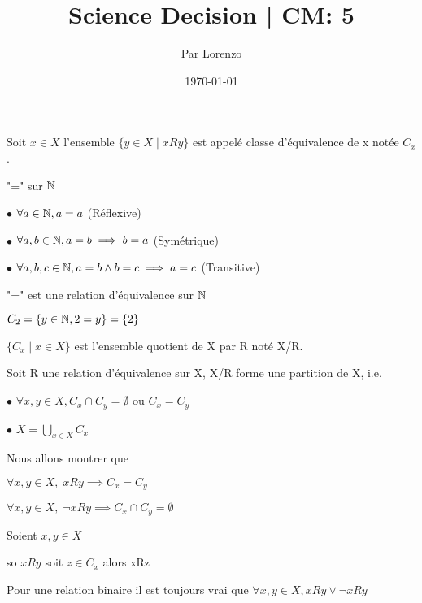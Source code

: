 \documentclass[a4paper, 12pt]{article}
\title{Science Decision | CM: 5}
\author{Par Lorenzo}
\date{\today}
\begin{document}
\maketitle

Soit $x \in X$ l'ensemble $\{y \in X \mid xRy\}$ est appelé classe d'équivalence
de x notée $C_x$.

\begin{example}
    "=" sur $\mathbb{N}$

    \item $\bullet$ $\forall a \in \mathbb{N}, a = a$ (Réflexive)
    \item $\bullet$ $\forall a, b \in \mathbb{N}, a = b \implies b = a$ (Symétrique)
    \item $\bullet$ $\forall a, b, c \in \mathbb{N}, a = b \land b = c \implies a = c$ (Transitive)

    "=" est une relation d'équivalence sur $\mathbb{N}$

    $C_2 = \{y \in \mathbb{N}, 2 = y\} = \{2\}$
\end{example}

$\{C_x \mid x \in X\}$ est l'ensemble quotient de X par R noté X/R.

\begin{proposition}
    Soit R une relation d'équivalence sur X, X/R forme une partition de X,
    i.e.

    \item $\bullet$ $\forall x, y \in X, C_x \cap C_y = \emptyset \text{ ou } C_x = C_y$
    \item $\bullet$ $X = \bigcup_{x \in X} C_x$
\end{proposition}

\begin{demonstration}
    Nous allons montrer que

    $\forall x, y \in X, \; xRy \implies C_x = C_y$

    $\forall x, y \in X, \; \neg xRy \implies C_x \cap C_y = \emptyset$

    Soient $x, y \in X$

    so $xRy$ soit $z \in C_x$ alors xRz
\end{demonstration}

\begin{remark}
    Pour une relation binaire il est toujours vrai que $\forall x, y \in X, xRy \lor \neg xRy$
\end{remark}

\end{document}

